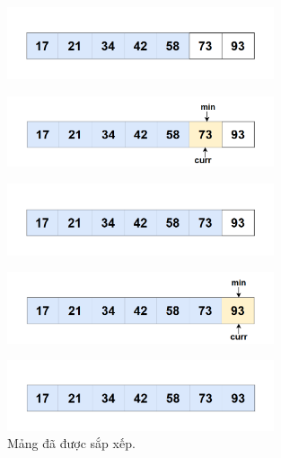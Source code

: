 \begin{itemize}
\begin{figure}[H]
    \centering
    \includegraphics[width=0.7\textwidth]{img/selection sort/11.png} 
\end{figure}

\begin{figure}[H]
    \centering
    \includegraphics[width=0.7\textwidth]{img/selection sort/12.png} 
\end{figure}

\begin{figure}[H]
    \centering
    \includegraphics[width=0.7\textwidth]{img/selection sort/13.png} 
\end{figure}

\begin{figure}[H]
    \centering
    \includegraphics[width=0.7\textwidth]{img/selection sort/14.png} 
\end{figure}

\begin{figure}[H]
    \centering
    \includegraphics[width=0.7\textwidth]{img/selection sort/15.png} 
    \caption{Mảng đã được sắp xếp.}
\end{figure}


\end{itemize}

